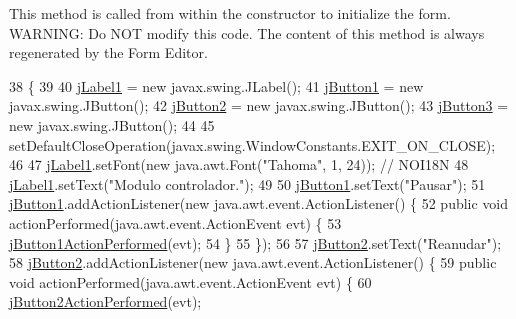 This method is called from within the constructor to initialize the form. W\+A\+R\+N\+I\+NG\+: Do N\+OT modify this code. The content of this method is always regenerated by the Form Editor. 
\begin{DoxyCode}
38                                   \{
39 
40         \mbox{\hyperlink{class_r_m_i_1_1_modulo_control_a4b11316f909c6d5bda3ccd3d1d41ce92}{jLabel1}} = \textcolor{keyword}{new} javax.swing.JLabel();
41         \mbox{\hyperlink{class_r_m_i_1_1_modulo_control_a925d9d1d7eff319b2573c334a20e3da1}{jButton1}} = \textcolor{keyword}{new} javax.swing.JButton();
42         \mbox{\hyperlink{class_r_m_i_1_1_modulo_control_aa5861c17fe034c546e4c455e4c86b1ad}{jButton2}} = \textcolor{keyword}{new} javax.swing.JButton();
43         \mbox{\hyperlink{class_r_m_i_1_1_modulo_control_af7702c5fb7079fd87c45617ca34997d2}{jButton3}} = \textcolor{keyword}{new} javax.swing.JButton();
44 
45         setDefaultCloseOperation(javax.swing.WindowConstants.EXIT\_ON\_CLOSE);
46 
47         \mbox{\hyperlink{class_r_m_i_1_1_modulo_control_a4b11316f909c6d5bda3ccd3d1d41ce92}{jLabel1}}.setFont(\textcolor{keyword}{new} java.awt.Font(\textcolor{stringliteral}{"Tahoma"}, 1, 24)); \textcolor{comment}{// NOI18N}
48         \mbox{\hyperlink{class_r_m_i_1_1_modulo_control_a4b11316f909c6d5bda3ccd3d1d41ce92}{jLabel1}}.setText(\textcolor{stringliteral}{"Modulo controlador."});
49 
50         \mbox{\hyperlink{class_r_m_i_1_1_modulo_control_a925d9d1d7eff319b2573c334a20e3da1}{jButton1}}.setText(\textcolor{stringliteral}{"Pausar"});
51         \mbox{\hyperlink{class_r_m_i_1_1_modulo_control_a925d9d1d7eff319b2573c334a20e3da1}{jButton1}}.addActionListener(\textcolor{keyword}{new} java.awt.event.ActionListener() \{
52             \textcolor{keyword}{public} \textcolor{keywordtype}{void} actionPerformed(java.awt.event.ActionEvent evt) \{
53                 \mbox{\hyperlink{class_r_m_i_1_1_modulo_control_aa1f3423a2628d662e839467d913f0b34}{jButton1ActionPerformed}}(evt);
54             \}
55         \});
56 
57         \mbox{\hyperlink{class_r_m_i_1_1_modulo_control_aa5861c17fe034c546e4c455e4c86b1ad}{jButton2}}.setText(\textcolor{stringliteral}{"Reanudar"});
58         \mbox{\hyperlink{class_r_m_i_1_1_modulo_control_aa5861c17fe034c546e4c455e4c86b1ad}{jButton2}}.addActionListener(\textcolor{keyword}{new} java.awt.event.ActionListener() \{
59             \textcolor{keyword}{public} \textcolor{keywordtype}{void} actionPerformed(java.awt.event.ActionEvent evt) \{
60                 \mbox{\hyperlink{class_r_m_i_1_1_modulo_control_a1ee8d16529785370c7fa377b78b54387}{jButton2ActionPerformed}}(evt);

\end{DoxyCode}

